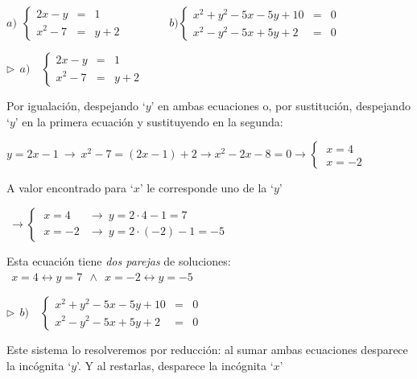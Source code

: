 \begin{miejemplo}

$a)\ \ \left\{ \begin{array}{rcr}
 	2x-y&=&1 \\ x^2-7&=&y+2 
 \end{array} \right.
 \qquad \qquad  b) \left\{
 \begin{array}{rcr}
 x^2+y^2-5x-5y+10&=&0  \\ x^2-y^2-5x+5y+2&=&0
 \end{array} \right.$
 
\vspace{8mm} $\triangleright \ \ a) \quad \left\{ \begin{array}{rcr}
 	2x-y&=&1 \\ x^2-7&=&y+2 
 \end{array} \right.$  
 
\vspace{2mm} Por igualación, despejando `$ y $' en ambas ecuaciones o, por sustitución, despejando `$y$' en la primera ecuación y sustituyendo en la segunda:

\vspace{2mm} $y=2x-1 \ \to \ x^2-7=(2x-1)+2 \to x^2-2x-8=0 \to \begin{cases}\ x=4 \\ \ x=-2 \end{cases} $ 

\vspace{2mm} A valor encontrado para `$x$' le corresponde uno de la `$y$' 

\vspace{2mm} $\ \to \begin{cases}\ x=4  & \to \ y=2\cdot 4-1=7\\ \ x=-2 & \to \  y=2\cdot(-2)-1=-5 \end{cases} $

\vspace{2mm} Esta ecuación tiene \emph{dos parejas} de soluciones: $\ \ x=4 \leftrightarrow y=7 \ \ \wedge \ \ x=-2  \leftrightarrow y=-5$
 
\vspace{8mm} $\triangleright \ \ b) \quad \left\{ \begin{array}{rcr}x^2+y^2-5x-5y+10&=&0  \\ x^2-y^2-5x+5y+2&=&0  \end{array} \right.$
 
\vspace{2mm} Este sistema lo resolveremos por reducción: al sumar ambas ecuaciones desparece la incógnita `$y$'. Y al restarlas, desparece la incógnita `$x$'


\end{miejemplo}
